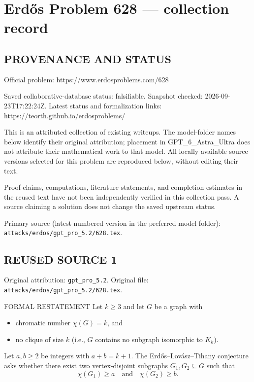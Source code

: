 \section*{Erd\H{o}s Problem 628 --- collection record}

\subsection*{PROVENANCE AND STATUS}
Official problem: https://www.erdosproblems.com/628

Saved collaborative-database status: falsifiable.
Snapshot checked: 2026-09-23T17:22:24Z.
Latest status and formalization links: https://teorth.github.io/erdosproblems/

This is an attributed collection of existing writeups. The model-folder names below identify their original attribution; placement in GPT\_6\_Astra\_Ultra does not attribute their mathematical work to that model. All locally available source versions selected for this problem are reproduced below, without editing their text.

Proof claims, computations, literature statements, and completion estimates in the reused text have not been independently verified in this collection pass. A source claiming a solution does not change the saved upstream status.

Primary source (latest numbered version in the preferred model folder): \texttt{attacks/erdos/gpt\_pro\_5.2/628.tex}.

\subsection*{REUSED SOURCE 1}
Original attribution: \texttt{gpt\_pro\_5.2}.
Original file: \texttt{attacks/erdos/gpt\_pro\_5.2/628.tex}.


FORMAL RESTATEMENT
Let $k\ge3$ and let $G$ be a graph with
\begin{itemize}
\item chromatic number $\chi(G)=k$, and
\item no clique of size $k$ (i.e., $G$ contains no subgraph isomorphic to $K_k$).
\end{itemize}
Let $a,b\ge2$ be integers with $a+b=k+1$.
The Erd\H{o}s--Lov\'asz--Tihany conjecture asks whether there exist two
vertex-disjoint subgraphs $G_1,G_2\subseteq G$ such that
\[
\chi(G_1)\ge a\quad\text{and}\quad \chi(G_2)\ge b.
\]

